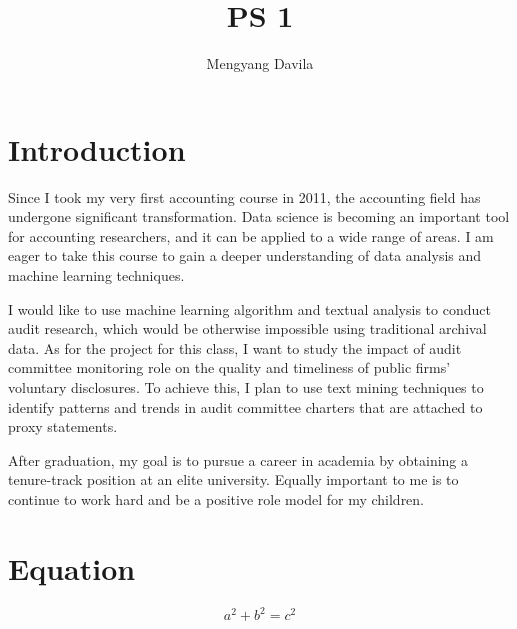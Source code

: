 \documentclass{article}
\title{PS 1}
\author{Mengyang Davila}
\begin{document}
\maketitle

\section{Introduction}
\indent Since I took my very first accounting course in 2011, the accounting field has undergone significant transformation. Data science is becoming an important tool for accounting researchers, and it can be applied to a wide range of areas. I am eager to take this course to gain a deeper understanding of data analysis and machine learning techniques. 

I would like to use machine learning algorithm and textual analysis to conduct audit research, which would be otherwise impossible using traditional archival data. As for the project for this class, I want to study the impact of audit committee monitoring role on the quality and timeliness of public firms' voluntary disclosures. To achieve this, I plan to use text mining techniques to identify patterns and trends in audit committee charters that are attached to proxy statements.

After graduation, my goal is to pursue a career in academia by obtaining a tenure-track position at an elite university. Equally important to me is to continue to work hard and be a positive role model for my children.

\section{Equation}

\[a^2 + b^2 = c^2\]
\end{document}
